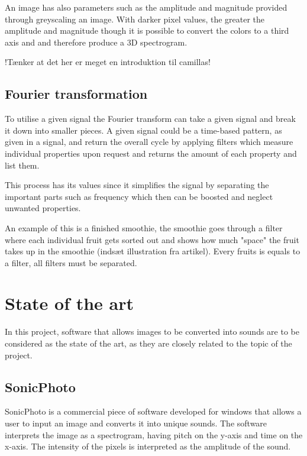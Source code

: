 An image has also parameters such as the amplitude and magnitude provided through greyscaling an image.  With darker pixel values, the greater the amplitude and magnitude though it is possible to convert the colors to a third axis and and therefore produce a 3D spectrogram.


!Tænker at det her er meget en introduktion til camillas!

\subsection{Fourier transformation}\label{sub:fourier}

To utilise a given signal the Fourier transform can take a given signal and break it down into smaller pieces. A given signal could be a time-based pattern, as given in a signal, and return the overall cycle by applying filters which measure individual properties upon request and returns the amount of each property and list them. 

This process has its values since it simplifies the signal by separating the important parts such as frequency which then can be boosted and neglect unwanted properties.       

An example of this is a finished smoothie, the smoothie goes through a filter where each individual fruit gets sorted out and shows how much "space" the fruit takes up in the smoothie (indsæt illustration fra artikel). Every fruits is equals to a filter, all filters must be separated. 

\section{State of the art}\label{sec:stateart}
In this project, software that allows images to be converted into sounds are to be considered as the state of the art, as they are closely related to the topic of the project.

\subsection{SonicPhoto}\label{sub:sonic}
SonicPhoto \cite{White2013} is a commercial piece of software developed for windows that allows a user to input an image and converts it into unique sounds. The software interprets the image as a spectrogram, having pitch on the y-axis and time on the x-axis. The intensity of the pixels is interpreted as the amplitude of the sound. 

